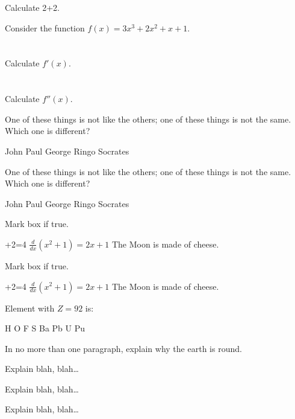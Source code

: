 \documentclass[12pt]{exam}
\begin{document}
\begin{questions}

\question[1] Calculate 2+2.
\addpoints

\question[20] Consider the function $f(x)=3x^3+2x^2+x+1$.
\noaddpoints %
\begin{parts}
\part[10]{} Calculate $f'(x)$.
\part[10]{} Calculate $f''(x)$.
\end{parts}
\addpoints

\question[2] One of these things is not like the others; one of these
things is not the same. Which one is different?
\begin{choices}
\choice John
\choice Paul
\choice George
\choice Ringo
\choice Socrates
\end{choices}

\question[2] One of these things is not like the others; one of these
things is not the same. Which one is different?
\begin{oneparchoices}
\choice John
\choice Paul
\choice George
\choice Ringo
\choice Socrates
\end{oneparchoices}

\question[3] Mark box if true.
\addpoints
\begin{checkboxes}
+2=4
\choice $\frac{d}{dx} (x^2+1) = 2x+1$
\choice The Moon is made of cheese.
\end{checkboxes}

{%
\checkboxchar{$\Box$} %
\question[3] Mark box if true.
\addpoints
\begin{checkboxes}
+2=4
\choice $\frac{d}{dx} (x^2+1) = 2x+1$
\choice The Moon is made of cheese.
\end{checkboxes}
}%

{%
\renewcommand*\thechoice{\arabic{choice}} 
\renewcommand*\choicelabel{\thechoice)}
%
\question[2] Element with $Z=92$ is:
\begin{multicols}{2}
\begin{choices}
\choice H
\choice O
\choice F
\choice S
\choice Ba
\choice Pb
\choice U
\choice Pu
\end{choices}
\end{multicols}
}%

\question[10]
In no more than one paragraph, explain why the earth is round.
\makeemptybox{2in}

\question[20]
Explain blah, blah\ldots
\makeemptybox{\fill}

\newpage

\question[20]
Explain blah, blah\ldots
\fillwithlines{\fill}

\newpage

\question[20]
Explain blah, blah\ldots
\fillwithdottedlines{8em}

\end{questions}
\end{document}
